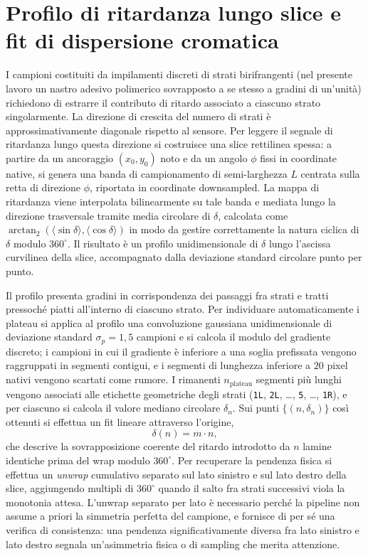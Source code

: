 \section{Profilo di ritardanza lungo slice e fit di dispersione cromatica}
\label{sec:slice_dispersione}

I campioni costituiti da impilamenti discreti di strati birifrangenti (nel presente lavoro un nastro adesivo polimerico sovrapposto a se stesso a gradini di un'unità) richiedono di estrarre il contributo di ritardo associato a ciascuno strato singolarmente. La direzione di crescita del numero di strati è approssimativamente diagonale rispetto al sensore. Per leggere il segnale di ritardanza lungo questa direzione si costruisce una slice rettilinea spessa: a partire da un ancoraggio $(x_0, y_0)$ noto e da un angolo $\phi$ fissi in coordinate native, si genera una banda di campionamento di semi-larghezza $L$ centrata sulla retta di direzione $\phi$, riportata in coordinate downsampled. La mappa di ritardanza viene interpolata bilinearmente su tale banda e mediata lungo la direzione trasversale tramite media circolare di $\delta$, calcolata come $\arctan_2(\langle \sin\delta\rangle, \langle\cos\delta\rangle)$ in modo da gestire correttamente la natura ciclica di $\delta$ modulo $360^\circ$. Il risultato è un profilo unidimensionale di $\delta$ lungo l'ascissa curvilinea della slice, accompagnato dalla deviazione standard circolare punto per punto.

Il profilo presenta gradini in corrispondenza dei passaggi fra strati e tratti pressoché piatti all'interno di ciascuno strato. Per individuare automaticamente i plateau si applica al profilo una convoluzione gaussiana unidimensionale di deviazione standard $\sigma_p = 1{,}5$ campioni e si calcola il modulo del gradiente discreto; i campioni in cui il gradiente è inferiore a una soglia prefissata vengono raggruppati in segmenti contigui, e i segmenti di lunghezza inferiore a $20$ pixel nativi vengono scartati come rumore. I rimanenti $n_{\mathrm{plateau}}$ segmenti più lunghi vengono associati alle etichette geometriche degli strati (\texttt{1L}, \texttt{2L}, \dots, \texttt{5}, \dots, \texttt{1R}), e per ciascuno si calcola il valore mediano circolare $\delta_n$. Sui punti $\{(n, \delta_n)\}$ così ottenuti si effettua un fit lineare attraverso l'origine,
\begin{equation}
    \delta(n) = m \cdot n,
    \label{eq:fit_strati}
\end{equation}
che descrive la sovrapposizione coerente del ritardo introdotto da $n$ lamine identiche prima del wrap modulo $360^\circ$. Per recuperare la pendenza fisica si effettua un \emph{unwrap} cumulativo separato sul lato sinistro e sul lato destro della slice, aggiungendo multipli di $360^\circ$ quando il salto fra strati successivi viola la monotonia attesa. L'unwrap separato per lato è necessario perché la pipeline non assume a priori la simmetria perfetta del campione, e fornisce di per sé una verifica di consistenza: una pendenza significativamente diversa fra lato sinistro e lato destro segnala un'asimmetria fisica o di sampling che merita attenzione.

